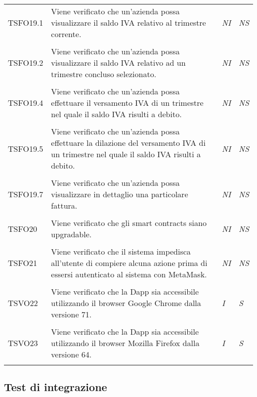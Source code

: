\begin{longtable}{ >{\centering}p{} >{}p{}
			>{\centering}p{} >{\centering}p{}}
		\tabularnewline
		\hypertarget{TSFO19.1}{TSFO19.1} & Viene verificato che un'azienda possa 
		visualizzare il saldo IVA relativo al trimestre corrente. & 
		\textit{NI} & \textit{NS}\\ 

		\tabularnewline
		\hypertarget{TSFO19.2}{TSFO19.2} & Viene verificato che un'azienda possa 
		visualizzare il saldo IVA relativo ad un trimestre concluso selezionato. & 
		\textit{NI} & \textit{NS}\\ 

		\tabularnewline
		\hypertarget{TSFO19.4}{TSFO19.4} & Viene verificato che un'azienda possa 
		effettuare il versamento IVA di un trimestre nel quale il saldo IVA risulti a 
		debito. & \textit{NI} & \textit{NS}\\ 

		\tabularnewline
		\hypertarget{TSFO19.5}{TSFO19.5} & Viene verificato che un'azienda possa 
		effettuare la dilazione del versamento IVA di un trimestre nel quale il saldo 
		IVA risulti a debito. & \textit{NI} & \textit{NS}\\ 

		\tabularnewline
		\hypertarget{TSFO19.7}{TSFO19.7} & Viene verificato che un'azienda possa 
		visualizzare in dettaglio una particolare fattura. & \textit{NI} & \textit{NS}\\ 

		\tabularnewline
		\hypertarget{TSFO20}{TSFO20} & Viene verificato che gli smart contracts siano 
		upgradable. & \textit{NI} & \textit{NS}\\ 

		\tabularnewline
		\hypertarget{TSFO21}{TSFO21} & Viene verificato che il sistema impedisca 
		all'utente di compiere alcuna azione prima di essersi autenticato al sistema con 
		MetaMask. & \textit{NI} & \textit{NS}\\ 

		\tabularnewline
		\hypertarget{TSVO22}{TSVO22} & Viene verificato che la Dapp sia accessibile 
		utilizzando il browser Google Chrome dalla versione 71. & 
		\textit{I} & \textit{S}\\

		\tabularnewline
		\hypertarget{TSVO23}{TSVO23} & Viene verificato che la Dapp sia accessibile 
		utilizzando il browser Mozilla Firefox dalla versione 64. & \textit{I} 
		& \textit{S}\\  
		\tabularnewline
		\end{longtable}


\subsection{Test di integrazione}
	\renewcommand{\arraystretch}{1.5}
		
